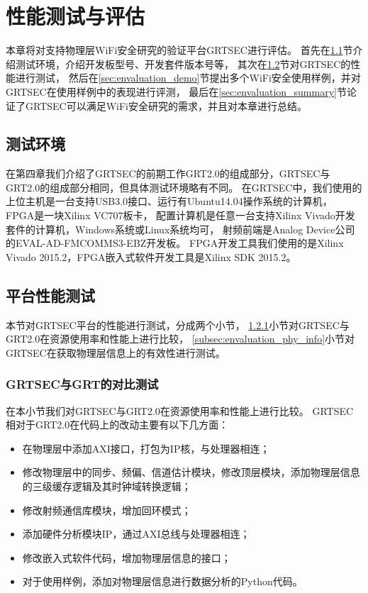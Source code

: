 
\chapter{性能测试与评估}\label{chap:envaluation}
本章将对支持物理层WiFi安全研究的验证平台GRTSEC进行评估。
首先在\ref{sec:envaluation_env_setup}节介绍测试环境，介绍开发板型号、开发套件版本号等，
其次在\ref{sec:envaluation_performance}节对GRTSEC的性能进行测试，
然后在\ref{sec:envaluation_demo}节提出多个WiFi安全使用样例，并对GRTSEC在使用样例中的表现进行评测，
最后在\ref{sec:envaluation_summary}节论证了GRTSEC可以满足WiFi安全研究的需求，并且对本章进行总结。

  \section{测试环境}\label{sec:envaluation_env_setup}
  在第四章我们介绍了GRTSEC的前期工作GRT2.0的组成部分，GRTSEC与GRT2.0的组成部分相同，但具体测试环境略有不同。
  在GRTSEC中，我们使用的上位主机是一台支持USB3.0接口、运行有Ubuntu14.04操作系统的计算机，
  FPGA是一块Xilinx VC707板卡\cite{xilinxvc707}，
  配置计算机是任意一台支持Xilinx Vivado开发套件的计算机，Windows系统或Linux系统均可，
  射频前端是Analog Device公司的EVAL-AD-FMCOMMS3-EBZ开发板\cite{fmcomms3}。
  FPGA开发工具我们使用的是Xilinx Vivado 2015.2，FPGA嵌入式软件开发工具是Xilinx SDK 2015.2。

  \section{平台性能测试}\label{sec:envaluation_performance}
  本节对GRTSEC平台的性能进行测试，分成两个小节，
  \ref{subsec:envaluation_comparation}小节对GRTSEC与GRT2.0在资源使用率和性能上进行比较，
  \ref{subsec:envaluation_phy_info}小节对GRTSEC在获取物理层信息上的有效性进行测试。

    \subsection{GRTSEC与GRT的对比测试}\label{subsec:envaluation_comparation}
    在本小节我们对GRTSEC与GRT2.0在资源使用率和性能上进行比较。
    GRTSEC相对于GRT2.0在代码上的改动主要有以下几方面：
    	\begin{itemize}
        \item 在物理层中添加AXI接口，打包为IP核，与处理器相连；
    		\item 修改物理层中的同步、频偏、信道估计模块，修改顶层模块，添加物理层信息的三级缓存逻辑及其时钟域转换逻辑；
        \item 修改射频通信库模块，增加回环模式；
    		\item 添加硬件分析模块IP，通过AXI总线与处理器相连；
        \item 修改嵌入式软件代码，增加物理层信息的接口；
        \item 对于使用样例，添加对物理层信息进行数据分析的Python代码。
    	\end{itemize}

